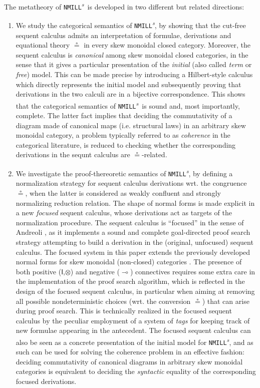 \documentclass[submission,copyright,creativecommons]{eptcs}
\theoremstyle{definition}
\newcommand{\ot}{\otimes}
\newcommand{\lolli}{\multimap}
\newcommand{\I}{\mathsf{I}}
\newcommand{\NMILL}{\texttt{NMILL}}
\newcommand{\SkNMILL}{\NMILL\textsuperscript{\textit{s}}}
\begin{document}
The metatheory of \SkNMILL\ is developed in two different but related directions:
\begin{enumerate}[($i$)]
  \item We study the categorical semantics of \SkNMILL, by showing that the cut-free sequent calculus admits an interpretation of formulae, derivations and equational theory $\circeq$ in every skew monoidal closed category. Moreover, the sequent calculus is \emph{canonical} among skew monoidal closed categories, in the sense that it gives a particular presentation of the \emph{initial} (also called \emph{term} or \emph{free}) model. This can be made precise by introducing a Hilbert-style calculus which directly represents the initial model and subsequently proving that derivations in the two calculi are in a bijective correspondence.
This shows that the categorical semantics of \SkNMILL\ is sound and, most importantly, complete. The latter fact implies that deciding the commutativity of a diagram made of canonical maps (i.e. structural laws) in an arbitrary skew monoidal category, a problem typically referred to as \emph{coherence} in the categorical literature, is reduced to checking whether the corresponding derivations in the sequnt calculus are $\circeq$-related.

\item We investigate the proof-thereoretic semantics of \SkNMILL, by defining a normalization strategy for sequent calculus derivations wrt. the congruence $\circeq$, when the latter is considered as weakly confluent and strongly normalizing reduction relation. The shape of normal forms is made explicit in a new \emph{focused} sequent calculus, whose derivations act as targets of the normalization procedure. The sequent calculus is ``focused'' in the sense of Andreoli \cite{andreoli:logic:1992}, as it implements a sound and complete goal-directed proof search strategy attempting to build a derivation in the (original, unfocused) sequent calculus. The focused system in this paper extends the previously
developed normal forms for skew monoidal (non-closed) categories \cite{uustalu:sequent:2021,uustalu:proof:nodate}. The presence of both positive ($\I$,$\ot$) and negative ($\lolli$) connectives requires some extra care in the implementation of the proof search algorithm, which is reflected in the design of the focused sequent calculus, in particular when aiming at removing all possible nondeterministic choices (wrt. the conversion $\circeq$) that can arise during proof search. This is technically realized in the focused sequent calculus by the peculiar employment of a system of \emph{tags} for keeping track of new formulae appearing in the antecedent. The focused sequent calculus can also be seen as a concrete presentation of the initial model for \SkNMILL, and as such can be used for solving the coherence problem in an effective fashion: deciding commutativity of canonical diagrams in arbitrary skew monoidal categories is equivalent to deciding the \emph{syntactic} equality of the corresponding focused derivations.
\end{enumerate}
\end{document}
